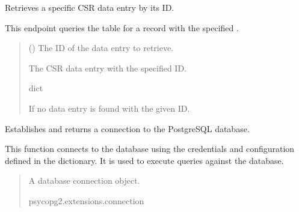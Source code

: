 \documentclass[letterpaper,10pt,english]{sphinxmanual}
\begin{document}

\begin{fulllineitems}
\label{\detokenize{my_fastapi:my_fastapi.main.get_data_by_id}}
\pysigstartsignatures
\pysiglinewithargsret
{}
{}
{}
\pysigstopsignatures
\sphinxAtStartPar
Retrieves a specific CSR data entry by its ID.

\sphinxAtStartPar
This endpoint queries the  table for a record with the specified .
\begin{quote}\begin{description}
\sphinxAtStartPar
{} () \textendash{} The ID of the data entry to retrieve.

\sphinxAtStartPar
The CSR data entry with the specified ID.

\sphinxAtStartPar
dict

\sphinxAtStartPar
{} \textendash{} If no data entry is found with the given ID.

\end{description}\end{quote}

\end{fulllineitems}


\begin{fulllineitems}
\label{\detokenize{my_fastapi:my_fastapi.main.get_db}}
\pysigstartsignatures
\pysiglinewithargsret
{}
{}
{}
\pysigstopsignatures
\sphinxAtStartPar
Establishes and returns a connection to the PostgreSQL database.

\sphinxAtStartPar
This function connects to the database using the credentials and configuration defined
in the  dictionary. It is used to execute queries against the database.
\begin{quote}\begin{description}
\sphinxAtStartPar
A database connection object.

\sphinxAtStartPar
psycopg2.extensions.connection

\end{description}\end{quote}

\end{fulllineitems}
\end{document}
